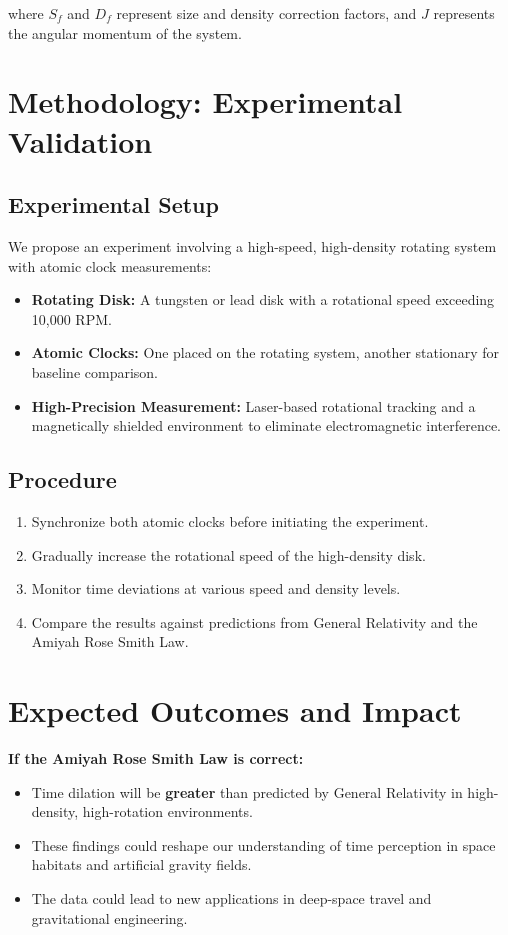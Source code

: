 \documentclass[12pt]{article}
\begin{document}
where \( S_f \) and \( D_f \) represent size and density correction factors, and \( J \) represents the angular momentum of the system.

\section{Methodology: Experimental Validation}

\subsection{Experimental Setup}

We propose an experiment involving a high-speed, high-density rotating system with atomic clock measurements:

\begin{itemize}
    \item \textbf{Rotating Disk:} A tungsten or lead disk with a rotational speed exceeding 10,000 RPM.
    \item \textbf{Atomic Clocks:} One placed on the rotating system, another stationary for baseline comparison.
    \item \textbf{High-Precision Measurement:} Laser-based rotational tracking and a magnetically shielded environment to eliminate electromagnetic interference.
\end{itemize}

\subsection{Procedure}

\begin{enumerate}
    \item Synchronize both atomic clocks before initiating the experiment.
    \item Gradually increase the rotational speed of the high-density disk.
    \item Monitor time deviations at various speed and density levels.
    \item Compare the results against predictions from General Relativity and the Amiyah Rose Smith Law.
\end{enumerate}

\section{Expected Outcomes and Impact}

\textbf{If the Amiyah Rose Smith Law is correct:}
\begin{itemize}
    \item Time dilation will be \textbf{greater} than predicted by General Relativity in high-density, high-rotation environments.
    \item These findings could reshape our understanding of time perception in space habitats and artificial gravity fields.
    \item The data could lead to new applications in deep-space travel and gravitational engineering.
\end{itemize}
\end{document}
